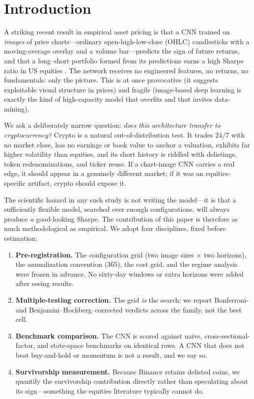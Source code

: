 \documentclass[11pt]{article}
\begin{document}
\section{Introduction}

A striking recent result in empirical asset pricing is that a CNN trained on \emph{images} of
price charts---ordinary open-high-low-close (OHLC) candlesticks with a moving-average overlay and a
volume bar---predicts the sign of future returns, and that a long--short portfolio formed from its
predictions earns a high Sharpe ratio in US equities \citep{jiang2023reimagining}. The network
receives no engineered features, no returns, no fundamentals: only the picture. This is at once
provocative (it suggests exploitable visual structure in prices) and fragile (image-based deep
learning is exactly the kind of high-capacity model that overfits and that invites data-mining).

We ask a deliberately narrow question: \emph{does this architecture transfer to cryptocurrency?}
Crypto is a natural out-of-distribution test. It trades $24/7$ with no market close, has no
earnings or book value to anchor a valuation, exhibits far higher volatility than equities, and its
short history is riddled with delistings, token redenominations, and ticker reuse. If a
chart-image CNN carries a real edge, it should appear in a genuinely different market; if it was an
equities-specific artifact, crypto should expose it.

The scientific hazard in any such study is not writing the model---it is that a sufficiently
flexible model, searched over enough configurations, will always produce \emph{a} good-looking
Sharpe. The contribution of this paper is therefore as much methodological as empirical. We adopt
four disciplines, fixed before estimation:

\begin{enumerate}[leftmargin=1.4em,itemsep=2pt]
\item \textbf{Pre-registration.} The configuration grid (two image sizes $\times$ two horizons),
the annualization convention ($365$), the cost grid, and the regime analysis were frozen in
advance. No sixty-day windows or extra horizons were added after seeing results.
\item \textbf{Multiple-testing correction.} The grid \emph{is} the search; we report Bonferroni-
and Benjamini--Hochberg--corrected verdicts across the family, not the best cell.
\item \textbf{Benchmark comparison.} The CNN is scored against naive, cross-sectional-factor, and
state-space benchmarks on identical rows. A CNN that does not beat buy-and-hold or momentum is not
a result, and we say so.
\item \textbf{Survivorship measurement.} Because Binance retains delisted coins, we quantify the
survivorship contribution directly rather than speculating about its sign---something the equities
literature typically cannot do.
\end{enumerate}
\end{document}
